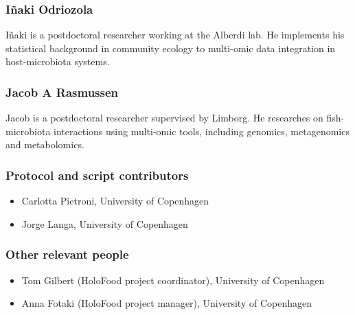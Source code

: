 \documentclass[
]{book}
\providecommand{\tightlist}{%
  \setlength{\itemsep}{0pt}\setlength{\parskip}{0pt}}
\begin{document}
\hypertarget{inaki-odriozola}{%
\subsubsection*{Iñaki Odriozola}\label{inaki-odriozola}}

Iñaki is a postdoctoral researcher working at the Alberdi lab. He implements his statistical background in community ecology to multi-omic data integration in host-microbiota systems.

\hypertarget{jacob-rasmussen}{%
\subsubsection*{Jacob A Rasmussen}\label{jacob-rasmussen}}

Jacob is a postdoctoral researcher supervised by Limborg. He researches on fish-microbiota interactions using multi-omic tools, including genomics, metagenomics and metabolomics.

\hypertarget{protocol-and-script-contributors}{%
\subsubsection*{Protocol and script contributors}\label{protocol-and-script-contributors}}

\begin{itemize}
\tightlist
\item
  Carlotta Pietroni, University of Copenhagen
\item
  Jorge Langa, University of Copenhagen
\end{itemize}

\hypertarget{other-relevant-people}{%
\subsubsection*{Other relevant people}\label{other-relevant-people}}

\begin{itemize}
\tightlist
\item
  Tom Gilbert (HoloFood project coordinator), University of Copenhagen
\item
  Anna Fotaki (HoloFood project manager), University of Copenhagen
\end{itemize}
\end{document}

